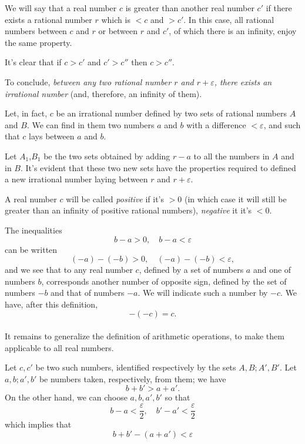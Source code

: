 \documentclass[10pt,letterpaper]{book}
\renewcommand\epsilon{\varepsilon}
\theoremstyle{definition}
\begin{document}
We will say that a real number $c$ is greater than another real number $c'$ if there exists a rational number $r$ which is $<c$ and $> c'$. In this case, all rational numbers between $c$ and $r$ or between $r$ and $c'$, of which there is an infinity, enjoy the same property.

It's clear that if $c> c'$ and $c' > c''$ then $c > c''$.

To conclude, \textit{between any two rational number $r$ and $r+\epsilon$, there exists an irrational number} (and, therefore, an infinity of them).


Let, in fact, $c$ be an irrational number defined by two sets of rational numbers $A$ and $B$. We can find in them two numbers $a$ and $b$ with a difference $<\epsilon$, and such that $c$ lays between $a$ and $b$.

Let $A_1$,$B_1$ be the two sets obtained by adding $r-a$ to all the numbers in $A$ and in $B$. It's evident that these two new sets have the properties required to defined a new irrational number laying between $r$ and $r+\epsilon$.

A real number $c$ will be called \textit{positive} if it's $> 0$ (in which case it will still be greater than an infinity of positive rational numbers), \textit{negative} it it's $< 0$.

The inequalities
\[
  b-a > 0,\quad b-a < \epsilon
\]
can be written
\[
  (-a) - (-b) > 0,\quad (-a)-(-b) < \epsilon,
\]
and we see that to any real number $c$, defined by a set of numbers $a$ and one of numbers $b$, corresponds another number of opposite sign, defined by the set of numbers $-b$ and that of numbers $-a$. We will indicate such a number by $-c$. We have, after this definition,
\[
  -(-c) = c.
\]

\paragraph{} It remains to generalize the definition of arithmetic operations, to make them applicable to all real numbers.

Let $c, c'$ be two such numbers, identified respectively by the sets $A, B; A', B'$. Let $a,b;a', b'$ be numbers taken, respectively, from them; we have
\[
  b+b' > a+a'.
\]
On the other hand, we can choose $a,b,a',b'$ so that
\[
  b-a < \frac \epsilon 2,\quad b'-a' < \frac \epsilon 2
\]
which implies that
\[
  b + b' - (a + a')< \epsilon
\]

\end{document}
